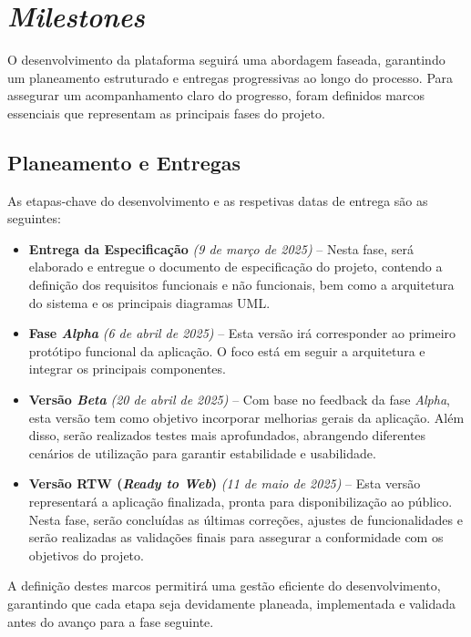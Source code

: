 \documentclass[a4paper, 12pt]{article} %
\begin{document}
\newpage
\section{\textit{Milestones}}
O desenvolvimento da plataforma seguirá uma abordagem faseada, garantindo um planeamento estruturado e entregas progressivas ao longo do processo. Para assegurar um acompanhamento claro do progresso, foram definidos marcos essenciais que representam as principais fases do projeto.

\subsection{Planeamento e Entregas}

As etapas-chave do desenvolvimento e as respetivas datas de entrega são as seguintes:

\begin{itemize}
	\item \textbf{Entrega da Especificação} \textit{(9 de março de 2025)} – Nesta fase, será elaborado e entregue o documento de especificação do projeto, contendo a definição dos requisitos funcionais e não funcionais, bem como a arquitetura do sistema e os principais diagramas UML.
	
	\item \textbf{Fase \textit{Alpha}} \textit{(6 de abril de 2025)} – Esta versão irá corresponder ao primeiro protótipo funcional da aplicação. O foco está em seguir a arquitetura e integrar os principais componentes.
	
	\item \textbf{Versão \textit{Beta}} \textit{(20 de abril de 2025)} – Com base no feedback da fase \textit{Alpha}, esta versão tem como objetivo incorporar melhorias gerais da aplicação. Além disso, serão realizados testes mais aprofundados, abrangendo diferentes cenários de utilização para garantir estabilidade e usabilidade.
	
	\item \textbf{Versão RTW (\textit{Ready to Web})} \textit{(11 de maio de 2025)} – Esta versão representará a aplicação finalizada, pronta para disponibilização ao público. Nesta fase, serão concluídas as últimas correções, ajustes de funcionalidades e serão realizadas as validações finais para assegurar a conformidade com os objetivos do projeto.
\end{itemize}

A definição destes marcos permitirá uma gestão eficiente do desenvolvimento, garantindo que cada etapa seja devidamente planeada, implementada e validada antes do avanço para a fase seguinte.
\end{document}
